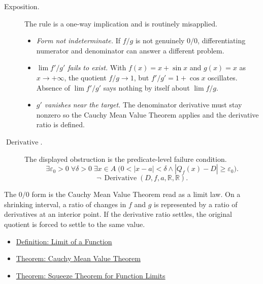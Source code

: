 \begin{remark*}
\begin{description}
  \item[Exposition.]
The rule is a one-way implication and is routinely misapplied.
\begin{itemize}
  \item \emph{Form not indeterminate.} If \(f/g\) is not genuinely \(0/0\),
        differentiating numerator and denominator can answer a different
        problem.
  \item \emph{\(\lim f'/g'\) fails to exist.} With \(f(x)=x+\sin x\) and
        \(g(x)=x\) as \(x\to+\infty\), the quotient \(f/g\to1\), but
        \(f'/g'=1+\cos x\) oscillates. Absence of \(\lim f'/g'\) says
        nothing by itself about \(\lim f/g\).
  \item \emph{\(g'\) vanishes near the target.} The denominator derivative
        must stay nonzero so the Cauchy Mean Value Theorem applies and the
        derivative ratio is defined.
\end{itemize}


  \item[\(\operatorname{Derivative}.\)]
  The displayed obstruction is the predicate-level failure condition.
  \[
  \exists\varepsilon_0>0\;\forall\delta>0\;\exists x\in A\;\bigl(0<|x-a|<\delta\land |Q_f(x)-D|\ge\varepsilon_0\bigr).
  \]
  \[
  \neg\,\operatorname{Derivative}(D,f,a,\mathbb{R},\mathbb{R}).
  \]
\end{description}
\end{remark*}

\begin{remark*}[Interpretation]
The \(0/0\) form is the Cauchy Mean Value Theorem read as a limit law. On a shrinking interval, a ratio of changes in \(f\) and \(g\) is represented by a ratio of derivatives at an interior point. If the derivative ratio settles, the original quotient is forced to settle to the same value.
\end{remark*}

\begin{dependencies}
\begin{itemize}
  \item \hyperref[def:limit-function]{Definition: Limit of a Function}
  \item \hyperref[thm:cauchy-mean-value-theorem]{Theorem: Cauchy Mean Value Theorem}
  \item \hyperref[thm:squeeze-function-limits]{Theorem: Squeeze Theorem for Function Limits}
\end{itemize}
\end{dependencies}

